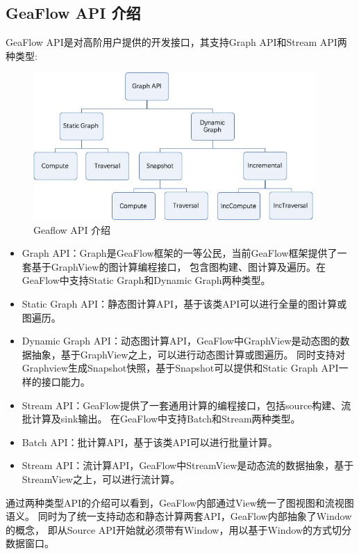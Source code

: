 \subsection{GeaFlow API 介绍}
GeaFlow API是对高阶用户提供的开发接口，其支持Graph API和Stream API两种类型:
\begin{figure}[H]
  \begin{center}
    \includegraphics[width=0.95\textwidth]{./figures/api_arch.jpeg}
  \end{center}
  \caption{Geaflow API 介绍}
\end{figure}
\begin{itemize}
  \item Graph API：Graph是GeaFlow框架的一等公民，当前GeaFlow框架提供了一套基于GraphView的图计算编程接口，
    包含图构建、图计算及遍历。在GeaFlow中支持Static Graph和Dynamic Graph两种类型。
  \item Static Graph API：静态图计算API，基于该类API可以进行全量的图计算或图遍历。
  \item Dynamic Graph API：动态图计算API，GeaFlow中GraphView是动态图的数据抽象，基于GraphView之上，可以进行动态图计算或图遍历。
    同时支持对Graphview生成Snapshot快照，基于Snapshot可以提供和Static Graph API一样的接口能力。
  \item Stream API：GeaFlow提供了一套通用计算的编程接口，包括source构建、流批计算及sink输出。
    在GeaFlow中支持Batch和Stream两种类型。
  \item Batch API：批计算API，基于该类API可以进行批量计算。
  \item Stream API：流计算API，GeaFlow中StreamView是动态流的数据抽象，基于StreamView之上，可以进行流计算。
\end{itemize}

通过两种类型API的介绍可以看到，GeaFlow内部通过View统一了图视图和流视图语义。
同时为了统一支持动态和静态计算两套API，GeaFlow内部抽象了Window的概念，
即从Source API开始就必须带有Window，用以基于Window的方式切分数据窗口。

